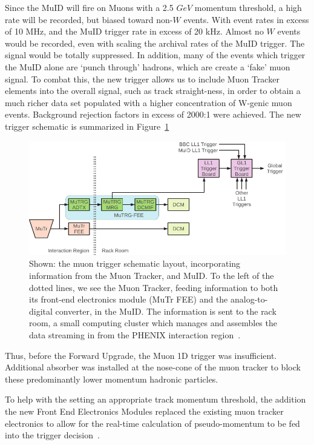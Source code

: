 Since the MuID will fire on Muons with a 2.5 $GeV$ momentum threshold, a high
rate will be recorded, but biased toward non-$W$ events. With event rates in
excess of 10 MHz, and the MuID trigger rate in excess of 20 kHz. Almost no $W$
events would be recorded, even with scaling the archival rates of the MuID
trigger. The signal would be totally suppressed. In addition, many of the events
which trigger the MuID alone are `punch through' hadrons, which are create a
`fake' muon signal. To combat this, the new trigger allows us to include Muon
Tracker elements into the overall signal, such as track straight-ness, in order
to obtain a much richer data set populated with a higher concentration of
W-genic muon events.  Background rejection factors in excess of 2000:1 were
achieved. The new trigger schematic is summarized in
Figure~\ref{fig:mutrig_layout}

\begin{figure}[ht]
  \includegraphics[width=\linewidth]{./figures/oide_mutr_layout.pdf}
  \caption{
    Shown: the muon trigger schematic layout, incorporating information from the
    Muon Tracker, and MuID. To the left of the dotted lines, we see the Muon
    Tracker, feeding information to both its front-end electronics module (MuTr
    FEE) and the analog-to-digital converter, in the MuID. The information is
    sent to the rack room, a small computing cluster which manages and assembles
    the data streaming in from the PHENIX interaction region~\cite{Oide2012}.
  }
  \label{fig:mutrig_layout}
\end{figure}

Thus, before the Forward Upgrade, the Muon 1D trigger was insufficient.
Additional absorber was installed at the nose-cone of the muon tracker to block
these predominantly lower momentum hadronic particles. 

To help with the setting an appropriate track momentum threshold, the addition
the new Front End Electronics Modules replaced the existing muon tracker
electronics to allow for the real-time calculation of pseudo-momentum to be fed
into the trigger decision~\cite{Fukao2011}.

